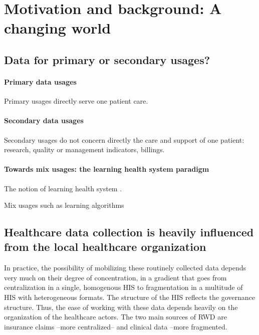 \documentclass[french,12pt,twoside,a4paper]{book}
\begin{document}
\clearpage
\section{Motivation and background: A changing world}\label{sec:cdw:motivation}

\subsection{Data for primary or secondary
  usages?}\label{subsec:cdw:data_usages}

\paragraph{Primary data usages}
Primary usages directly serve one patient care.

\paragraph{Secondary data usages}
Secondary usages do not concern directly the care and support of one patient:
research, quality or management indicators, billings.

\paragraph{Towards mix usages: the learning health system paradigm}

The notion of learning health system \citep{mcginnis2013best}.

Mix usages such as learning algorithms

\subsection{Healthcare data collection is heavily influenced from the local healthcare organization}

In practice, the possibility of mobilizing these routinely collected data
depends very much on their degree of concentration, in a gradient that goes from
centralization in a single, homogenous HIS to fragmentation in a multitude of
HIS with heterogeneous formats. The structure of the HIS reflects the governance
structure. Thus, the ease of working with these data depends heavily on the
organization of the healthcare actors. The two main sources of RWD are insurance
claims --more centralized-- and clinical data --more fragmented.
\end{document}
